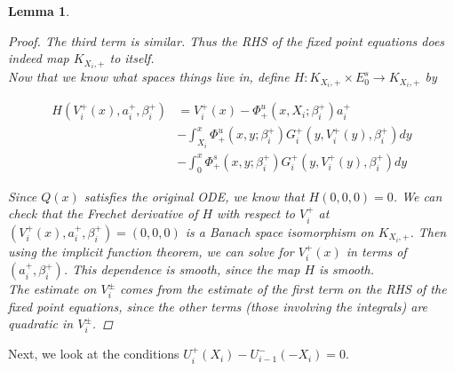 \documentclass[12pt]{article}
\newtheorem{lemma}{Lemma}
\begin{document}
\begin{lemma}
\begin{proof}
The third term is similar. Thus the RHS of the fixed point equations does indeed map $K_{X_i, +}$ to itself.\\

Now that we know what spaces things live in, define 
$H: K_{X_i, +} \times E_0^s \rightarrow K_{X_i, +}$ by

\begin{align*}
H(V_i^+(x), a_i^+, \beta_i^+) &= V_i^+(x) - \Phi^u_+(x, X_i; \beta_i^+) a_i^+  \\
&- \int_{X_i}^x \Phi_+^u(x, y; \beta_i^+) G_i^+(y, V_i^+(y),\beta_i^+)dy \\
&- \int_0^x \Phi_+^s(x, y; \beta_i^+) G_i^+(y, V_i^+(y),\beta_i^+)dy 
\end{align*}

Since $Q(x)$ satisfies the original ODE, we know that $H(0, 0, 0) = 0$. We can check that the Frechet derivative of $H$ with respect to $V_i^+$ at $(V_i^+(x), a_i^+, \beta_i^+) = (0, 0, 0)$ is a Banach space isomorphism on $K_{X_i, +}$. Then using the implicit function theorem, we can solve for $V_i^+(x)$ in terms of $(a_i^+, \beta_i^+)$. This dependence is smooth, since the map $H$ is smooth. \\

The estimate on $V_i^\pm$ comes from the estimate of the first term on the RHS of the fixed point equations, since the other terms (those involving the integrals) are quadratic in $V_i^\pm$. 

\end{proof}
\end{lemma}

Next, we look at the conditions $U_i^+(X_i) - U_{i-1}^-(-X_i) = 0$.

\end{document}
